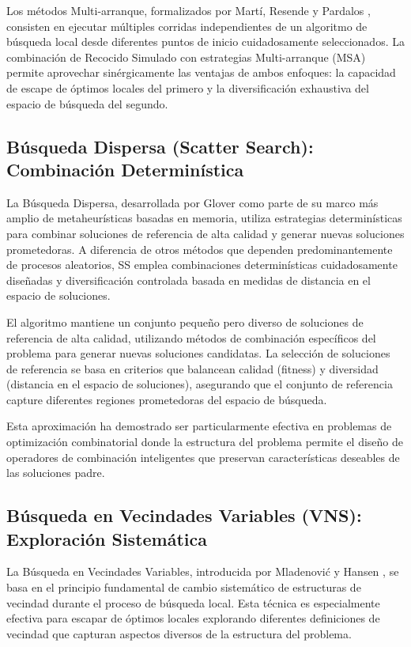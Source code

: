 Los métodos Multi-arranque, formalizados por Martí, Resende y Pardalos \cite{marti2018multistart}, consisten en ejecutar múltiples corridas independientes de un algoritmo de búsqueda local desde diferentes puntos de inicio cuidadosamente seleccionados. La combinación de Recocido Simulado con estrategias Multi-arranque (MSA) permite aprovechar sinérgicamente las ventajas de ambos enfoques: la capacidad de escape de óptimos locales del primero y la diversificación exhaustiva del espacio de búsqueda del segundo.

\subsection{Búsqueda Dispersa (Scatter Search): Combinación Determinística}

La Búsqueda Dispersa, desarrollada por Glover \cite{glover1998template} como parte de su marco más amplio de metaheurísticas basadas en memoria, utiliza estrategias determinísticas para combinar soluciones de referencia de alta calidad y generar nuevas soluciones prometedoras. A diferencia de otros métodos que dependen predominantemente de procesos aleatorios, SS emplea combinaciones determinísticas cuidadosamente diseñadas y diversificación controlada basada en medidas de distancia en el espacio de soluciones.

El algoritmo mantiene un conjunto pequeño pero diverso de soluciones de referencia de alta calidad, utilizando métodos de combinación específicos del problema para generar nuevas soluciones candidatas. La selección de soluciones de referencia se basa en criterios que balancean calidad (fitness) y diversidad (distancia en el espacio de soluciones), asegurando que el conjunto de referencia capture diferentes regiones prometedoras del espacio de búsqueda.

Esta aproximación ha demostrado ser particularmente efectiva en problemas de optimización combinatorial donde la estructura del problema permite el diseño de operadores de combinación inteligentes que preservan características deseables de las soluciones padre.

\subsection{Búsqueda en Vecindades Variables (VNS): Exploración Sistemática}

La Búsqueda en Vecindades Variables, introducida por Mladenović y Hansen \cite{mladenovic1997variable}, se basa en el principio fundamental de cambio sistemático de estructuras de vecindad durante el proceso de búsqueda local. Esta técnica es especialmente efectiva para escapar de óptimos locales explorando diferentes definiciones de vecindad que capturan aspectos diversos de la estructura del problema.

